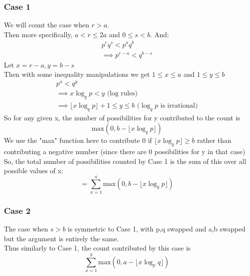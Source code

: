 \documentclass{article}
\begin{document}
\subsubsection{Case 1}
We will count the case when $r>a$.\\
Then more specifically, $a < r \leq 2a$ and $0 \leq s < b$. And:
\begin{equation*}
\begin{split}
    p^r q^s < p^a q^b\\
    \implies p^{r-a} < q^{b-s}
\end{split}
\end{equation*}
Let $x = r-a, y=b-s$\\
Then with some inequality manipulations we get $1 \leq x \leq a$ and $1 \leq y \leq b$
\begin{equation*}
\begin{split}
    p^x < q^y\\
    \implies x \log_q p < y \text{ (log rules)}\\
    \implies \lfloor x \log_q p \rfloor + 1 \leq y \leq b \text{ (} \log_q p \text{ is irrational)}
\end{split}
\end{equation*}
So for any given x, the number of possibilities for y contributed to the count is
\[\text{max}(0, b - \lfloor x\log_q p\rfloor)\]
We use the "max" function here to contribute 0 if $\lfloor x \log_q p\rfloor \geq b$ rather than contributing a negative number (since there are 0 possibilities for y in that case)\\
So, the total number of possibilities counted by Case 1 is the sum of this over all possible values of x:
\[ = \sum_{x=1}^a \text{max}(0, b - \lfloor x \log_q p\rfloor)\]

\subsubsection{Case 2}
The case when $s>b$ is symmetric to Case 1, with p,q swapped and a,b swapped but the argument is entirely the same.\\
Thus similarly to Case 1, the count contributed by this case is
\[ \sum_{x=1}^b \text{max}(0, a - \lfloor x \log_p q\rfloor)\]
\end{document}
